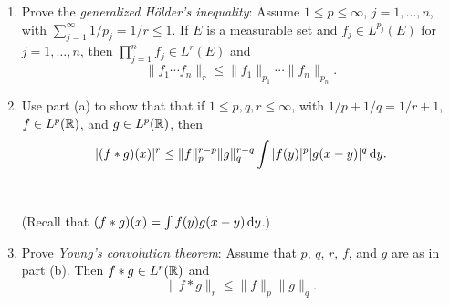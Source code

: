 \begin{problem}
  \hfill
  \begin{enumerate}[label=(\alph*),noitemsep]
  \item Prove the \emph{generalized Hölder's inequality}: Assume
    \(1\leq p\leq\infty\), \(j=1,\dotsc,n\), with
    \(\sum_{j=1}^\infty 1/p_j=1/r\leq 1\). If \(E\) is a measurable set and
    \(f_j\in L^{p_j}(E)\) for \(j=1,\dotsc,n\), then
    \(\prod_{j=1}^n f_j\in L^r(E)\) and
    \[
      \|f_1\dotsm f_n\|_r\leq\|f_1\|_{p_1}\dotsm\|f_n\|_{p_n}.
    \]
  \item Use part (a) to show that that if \(1\leq p,q,r\leq\infty\), with
    \(1/p+1/q=1/r+1\), \(f\in L^p(\mathbb{R})\), and \(g\in L^p(\mathbb{R})\), then
    \[
      |(f*g)(x)|^r\leq\|f\|_p^{r-p}\|g\|_q^{r-q}\int|f(y)|^p|g(x-y)|^q\mathop{}\!\mathrm{d}
      y.
    \]
    \\\\
    (Recall that \((f*g)(x)=\int f(y)g(x-y)\mathop{}\!\mathrm{d} y\).)
  \item Prove \emph{Young's convolution theorem}: Assume that \(p\), \(q\),
    \(r\), \(f\), and \(g\) are as in part (b). Then \(f*g\in L^r(\mathbb{R})\)
    and
    \[
      \|f*g\|_r\leq\|f\|_p\|g\|_q.
    \]
  \end{enumerate}
\end{problem}
\begin{solution}
\end{solution}

